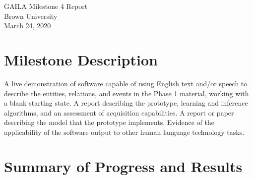 \documentclass[11pt]{article}
\newcommand{\soptitle}{GAILA Milestone 4 Report}
\newcommand{\yourname}{Brown University}
\newcommand{\affiliation}{March 24, 2020}
\begin{document}
\begin{center}\Large\soptitle\\
\medskip
\Large \yourname \\
\Large \affiliation \\
\end{center}



\section*{Milestone Description} 

A live demonstration of software capable of using English text and/or speech to describe the entities, relations, and events in the Phase 1 material, working with a blank starting state. A report describing the prototype, learning and inference algorithms, and an assessment of acquisition capabilities. A report or paper describing the model that the prototype implements. Evidence of the applicability of the software output to other human language technology tasks.

\section*{Summary of Progress and Results} 
\end{document}
